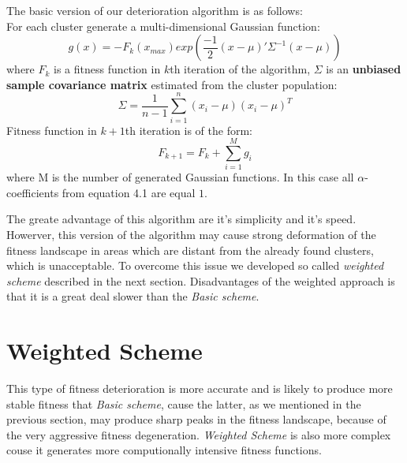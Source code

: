 The basic version of our deterioration algorithm is as follows: \\
For each cluster generate a multi-dimensional Gaussian function:
\begin{equation}
 g(x)= - F_k(x_{max}) exp(\frac{-1}{2}(x-\mu)'\Sigma^{-1}(x - \mu))
\end{equation}
where $F_k$ is a fitness function in $k$th iteration of the algorithm,
$\Sigma$ is an \textbf{unbiased sample covariance matrix} \cite{covariance}
estimated from the cluster population:
\begin{equation}
 \Sigma = \frac{1}{n-1}\sum_{i=1}^n(x_i - \mu)(x_i - \mu)^T
\end{equation}
Fitness function in $k+1$th iteration is of the form:
\begin{equation}
 F_{k+1}=F_k + \sum_{i=1}^M g_i
\end{equation}
where M is the number of generated Gaussian functions. In this case all
$\alpha$-coefficients from equation 4.1 are equal $1$.

The greate advantage of this algorithm are it's simplicity and it's speed.
Howerver, this version of the algorithm may cause strong deformation of the
fitness landscape in areas which are distant from the already found clusters,
which is unacceptable. To overcome this issue we
developed so called \textit{weighted scheme} described in the next section.
Disadvantages of the weighted approach is that it is a great deal slower
than the \textit{Basic scheme}. 

\section{Weighted Scheme}

This type of fitness deterioration is more accurate and is likely to produce
more stable fitness that \textit{Basic scheme}, cause the latter, as we
mentioned in the previous section, may produce sharp peaks in the fitness
landscape, because of the very aggressive fitness degeneration.
\textit{Weighted Scheme} is also more complex couse it generates
more computionally intensive fitness functions.

